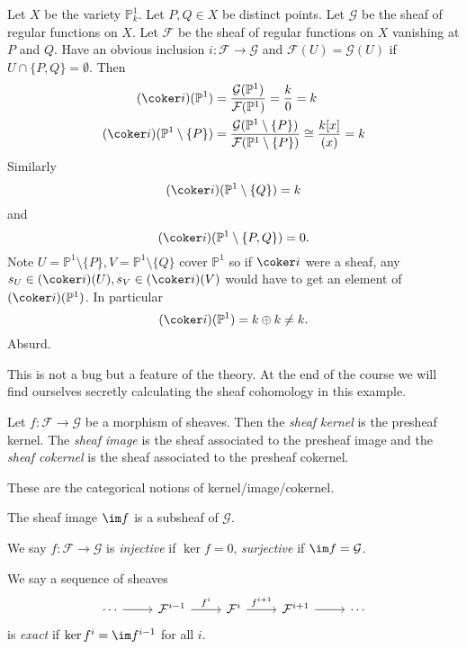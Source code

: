 \documentclass[a4paper]{article}
\renewcommand*{\P}{\mathbb{P}}
\newcommand{\sh}[1]{\mathcal{#1}} %
\begin{document}
\begin{eg}
  Let \(X\) be the variety \(\P^1_k\). Let \(P, Q \in X\) be distinct points. Let \(\sh G\) be the sheaf of regular functions on \(X\). Let \(\sh F\) be the sheaf of regular functions on \(X\) vanishing at \(P\) and \(Q\). Have an obvious inclusion \(i: \sh F \to \sh G\) and \(\sh F(U) = \sh G(U)\) if \(U \cap \{P, Q\} = \emptyset\). Then
  \begin{align*}
    (\coker i) (\P^1) &= \frac{\sh G (\P^1)}{\sh F(\P^1)} = \frac{k}{0} = k \\
    (\coker i) (\P^1 \setminus \{P\}) &= \frac{\sh G (\P^1 \setminus \{P\})}{\sh F (\P^1 \setminus \{P\})} \cong \frac{k[x]}{(x)} = k
  \end{align*}
  Similarly
  \[
    (\coker i) (\P^1 \setminus \{Q\}) = k
  \]
  and
  \[
    (\coker i) (\P^1 \setminus \{P, Q\}) = 0.
  \]
  Note \(U = \P^1 \setminus \{P\}, V = \P^1 \setminus \{Q\}\) cover \(\P^1\) so if \(\coker i\) were a sheaf, any \(s_U \in (\coker i)(U), s_V \in (\coker i)(V)\) would have to get an element of \((\coker i)(\P^1)\). In particular
  \[
    (\coker i) (\P^1) = k \oplus k \neq k.
  \]
  Absurd.

  This is not a bug but a feature of the theory. At the end of the course we will find ourselves secretly calculating the sheaf cohomology in this example.
\end{eg}

\begin{definition}
  Let \(f: \sh F \to \sh G\) be a morphism of sheaves. Then the \emph{sheaf kernel} is the presheaf kernel. The \emph{sheaf image} is the sheaf associated to the presheaf image and the \emph{sheaf cokernel} is the sheaf associated to the presheaf cokernel.
\end{definition}

These are the categorical notions of kernel/image/cokernel.

\begin{ex}
  The sheaf image \(\im f\) is a subsheaf of \(\sh G\).
\end{ex}

\begin{definition}
  We say \(f: \sh F \to \sh G\) is \emph{injective} if \(\ker f = 0\), \emph{surjective} if \(\im f = \sh G\).

  We say a sequence of sheaves
  \[
    \begin{tikzcd}
      \cdots \ar[r] & \sh F^{i - 1} \ar[r, "f^i"] & \sh F^i \ar[r, "f^{i + 1}"] & \sh F^{i + 1} \ar[r] & \cdots
    \end{tikzcd}
  \]
  is \emph{exact} if \(\ker f^i = \im f^{i - 1}\) for all \(i\).
\end{definition}
\end{document}

